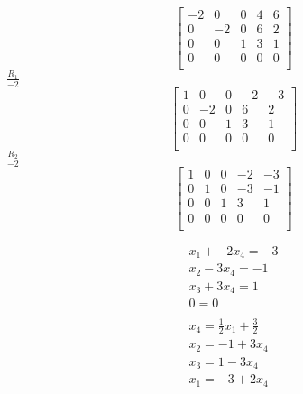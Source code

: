 \documentclass[12pt letter]{report}
\begin{document}
{\begin{enumerate}
          \[
            \begin{bmatrix}
              -2 & 0  & 0 & 4 & 6 \\
              0  & -2 & 0 & 6 & 2 \\
              0  & 0  & 1 & 3 & 1 \\
              0  & 0  & 0 & 0 & 0 \\
            \end{bmatrix}
          \]
          $\frac{R_1}{-2}$
          \[
            \begin{bmatrix}
              1 & 0  & 0 & -2 & -3 \\
              0 & -2 & 0 & 6  & 2  \\
              0 & 0  & 1 & 3  & 1  \\
              0 & 0  & 0 & 0  & 0  \\
            \end{bmatrix}
          \]
          $\frac{R_2}{-2}$
          \[
            \begin{bmatrix}
              1 & 0 & 0 & -2 & -3 \\
              0 & 1 & 0 & -3 & -1 \\
              0 & 0 & 1 & 3  & 1  \\
              0 & 0 & 0 & 0  & 0  \\
            \end{bmatrix}
          \]

          \begin{align*}
            x_1 + -2x_4 = -3                   \\
            x_2 -3x_4 = -1                     \\
            x_3 + 3x_4 = 1                     \\
            0 = 0                              \\
            \\
            x_4 = \frac{1}{2}x_1 + \frac{3}{2} \\
            x_2 = -1 + 3x_4                    \\
            x_3 = 1 - 3x_4                     \\
            x_1 = -3 + 2x_4
          \end{align*}

  \end{enumerate}
}
\end{document}
